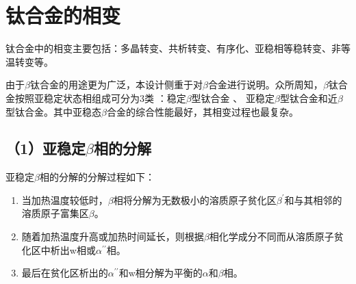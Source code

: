 \section{钛合金的相变}
钛合金中的相变主要包括：多晶转变、共析转变、有序化、亚稳相等稳转变、非等温转变等。


由于$\beta$钛合金的用途更为广泛，本设计侧重于对$\beta$合金进行说明。众所周知，$\beta$钛合金按照亚稳定状态相组成可分为3类 ：稳定$\beta$型钛合金 、 亚稳定$\beta$型钛合金和近$\beta$型钛合金。其中亚稳态$\beta$合金的综合性能最好，其相变过程也最复杂。


\subsection*{（1）亚稳定$\beta$相的分解}
亚稳定$\beta$相的分解的分解过程如下：
\begin{enumerate}
	\item  当加热温度较低时，$\beta$相将分解为无数极小的溶质原子贫化区$ \beta^{\prime} $和与其相邻的溶质原子富集区$\beta$。
	\item  随着加热温度升高或加热时间延长，则根据$\beta$相化学成分不同而从溶质原子贫化区中析出w相或$ \alpha^{\prime\prime} $相。
	\item  最后在贫化区析出的$ \alpha^{\prime\prime} $和w相分解为平衡的$\alpha$和$\beta$相。
\end{enumerate}

